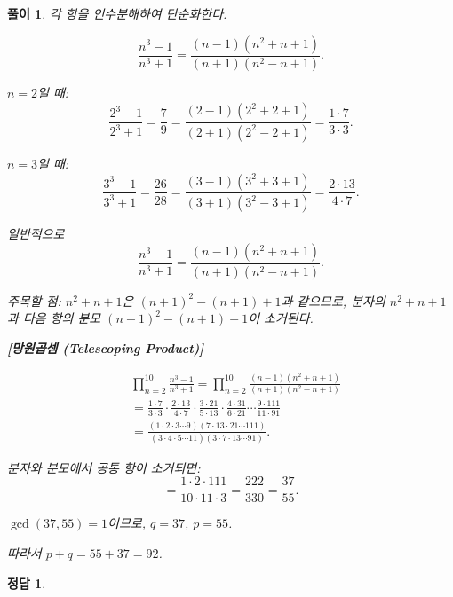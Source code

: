 \documentclass[12pt,a4paper]{article}
\theoremstyle{test_form}
\newtheorem{problem}{문제}[section]
\newtheorem*{solution}{풀이}
\newtheorem*{answer}{정답}
\begin{document}
\begin{solution}

\setlength{\parindent}{0pt}

각 항을 인수분해하여 단순화한다.

\[
\frac{n^3-1}{n^3+1}=\frac{(n-1)(n^2+n+1)}{(n+1)(n^2-n+1)}.
\]

\(n=2\)일 때:
\[
\frac{2^3-1}{2^3+1}=\frac{7}{9}=\frac{(2-1)(2^2+2+1)}{(2+1)(2^2-2+1)}=\frac{1\cdot 7}{3\cdot 3}.
\]

\(n=3\)일 때:
\[
\frac{3^3-1}{3^3+1}=\frac{26}{28}=\frac{(3-1)(3^2+3+1)}{(3+1)(3^2-3+1)}=\frac{2\cdot 13}{4\cdot 7}.
\]

일반적으로
\[
\frac{n^3-1}{n^3+1}=\frac{(n-1)(n^2+n+1)}{(n+1)(n^2-n+1)}.
\]

주목할 점: \(n^2+n+1\)은 \((n+1)^2-(n+1)+1\)과 같으므로, 분자의 \(n^2+n+1\)과 다음 항의 분모 \((n+1)^2-(n+1)+1\)이 소거된다.

\textbf{[망원곱셈 (Telescoping Product)]}

\[
\begin{aligned}
&\prod_{n=2}^{10}\frac{n^3-1}{n^3+1}=\prod_{n=2}^{10}\frac{(n-1)(n^2+n+1)}{(n+1)(n^2-n+1)}\\
&=\frac{1\cdot 7}{3\cdot 3}\cdot\frac{2\cdot 13}{4\cdot 7}\cdot\frac{3\cdot 21}{5\cdot 13}\cdot\frac{4\cdot 31}{6\cdot 21}\cdots\frac{9\cdot 111}{11\cdot 91}\\
&=\frac{(1\cdot 2\cdot 3\cdots 9)(7\cdot 13\cdot 21\cdots 111)}{(3\cdot 4\cdot 5\cdots 11)(3\cdot 7\cdot 13\cdots 91)}.
\end{aligned}
\]

분자와 분모에서 공통 항이 소거되면:
\[
=\frac{1\cdot 2\cdot 111}{10\cdot 11\cdot 3}=\frac{222}{330}=\frac{37}{55}.
\]

\(\gcd(37,55)=1\)이므로, \(q=37\), \(p=55\).

따라서 \(p+q=55+37=92\).

\end{solution}

\begin{answer}
\hfill {}
\end{answer}

\newpage

\end{document}
